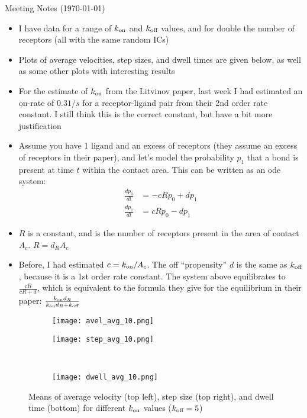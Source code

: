 \documentclass{article}
\newcommand{\tn}{\textnormal}
\begin{document}
\pagestyle{plain}

\begin{center}
  {\Large Meeting Notes (\today)}
\end{center}

\begin{itemize}
\item I have data for a range of $k_\tn{on}$ and $k_\tn{off}$ values,
  and for double the number of receptors (all with the same random
  ICs)
\item Plots of average velocities, step sizes, and dwell times are
  given below, as well as some other plots with interesting results
\item For the estimate of $k_\tn{on}$ from the Litvinov paper, last
  week I had estimated an on-rate of $0.31 /s$ for a receptor-ligand
  pair from their 2nd order rate constant. I still think this is the
  correct constant, but have a bit more justification
\item Assume you have 1 ligand and an excess of receptors (they assume
  an excess of receptors in their paper), and let's model the
  probability $p_1$ that a bond is present at time $t$ within the
  contact area. This can be written as an ode system:
  \begin{align*}
    \frac{d p_0}{dt} &= -c R p_0 + d p_1 \\
    \frac{d p_1}{dt} &= c R p_0 - d p_1
  \end{align*}
\item $R$ is a constant, and is the number of receptors present in the
  area of contact $A_c$. $R = d_R A_c$
\item Before, I had estimated $c = k_\tn{on} / A_c$. The off
  ``propensity'' $d$ is the same as $k_\tn{off}$, because it is a 1st
  order rate constant. The system above equilibrates to
  $\frac{c R}{c R + d}$, which is equivalent to the formula they give
  for the equilibrium in their paper:
  $\frac{k_\tn{on} d_R}{k_\tn{on} d_R + k_\tn{off}}$
\end{itemize}

\begin{figure}[h]
  \centering
  \begin{subfigure}{0.49\textwidth}
    \texttt{[image: avel\_avg\_10.png]}
  \end{subfigure}
  \hfill
  \begin{subfigure}{0.49\textwidth}
    \texttt{[image: step\_avg\_10.png]}
  \end{subfigure}
  \\
  \begin{subfigure}{0.49\textwidth}
    \texttt{[image: dwell\_avg\_10.png]}
  \end{subfigure}
  \label{fig:stats10}
  \caption{Means of average velocity (top left), step size (top
    right), and dwell time (bottom) for different $k_\tn{on}$
    values ($k_\tn{off} = 5$)}
\end{figure}
\end{document}
